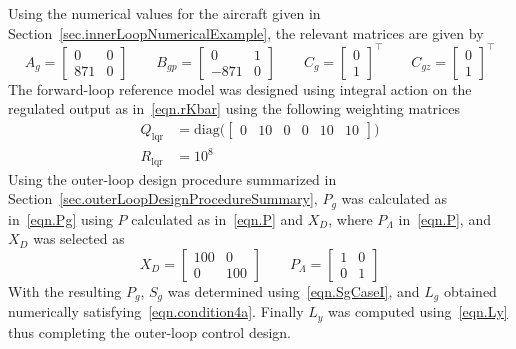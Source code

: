 Using the numerical values for the aircraft given in Section~\ref{sec.innerLoopNumericalExample}, the relevant matrices are given by
\begin{equation*}
  A_{g} =
  \begin{bmatrix}
    0 & 0 \\
    871 & 0
  \end{bmatrix}
  \qquad
  B_{gp} =
  \begin{bmatrix}
    0 & 1 \\
    -871 & 0
  \end{bmatrix}
  \qquad
  C_{g} =
  \begin{bmatrix}
    0 \\
    1
  \end{bmatrix}^{\top}
  \qquad
  C_{gz} =
  \begin{bmatrix}
    0 \\
    1
  \end{bmatrix}^{\top}
\end{equation*}
The forward-loop reference model was designed using integral action on the regulated output as in\ \eqref{eqn.rKbar} using the following weighting matrices
\begin{equation*}
  \begin{split}
    Q_{\text{lqr}}
    &=
    \text{diag}\bigr(
    \begin{bmatrix}
      0 & 10 & 0 & 0 & 10 & 10
    \end{bmatrix}
    \bigr) \\
    R_{\text{lqr}}
    &=
    10^{8}
  \end{split}
\end{equation*}
Using the outer-loop design procedure summarized in Section~\ref{sec.outerLoopDesignProcedureSummary}, $P_{g}$ was calculated as in\ \eqref{eqn.Pg} using $P$ calculated as in\ \eqref{eqn.P} and $X_{D}$, where $P_{\Lambda}$ in\ \eqref{eqn.P}, and $X_{D}$ was selected as
\begin{equation*}
  X_{D}
  =
  \begin{bmatrix}
    100 & 0 \\
    0 & 100
  \end{bmatrix}
  \qquad
  P_{\Lambda}
  =
  \begin{bmatrix}
    1 & 0 \\
    0 & 1
  \end{bmatrix}
\end{equation*}
With the resulting $P_{g}$, $S_{g}$ was determined using\ \eqref{eqn.SgCaseI}, and $L_{g}$ obtained numerically satisfying\ \eqref{eqn.condition4a}.
Finally $L_{y}$ was computed using\ \eqref{eqn.Ly} thus completing the outer-loop control design.

